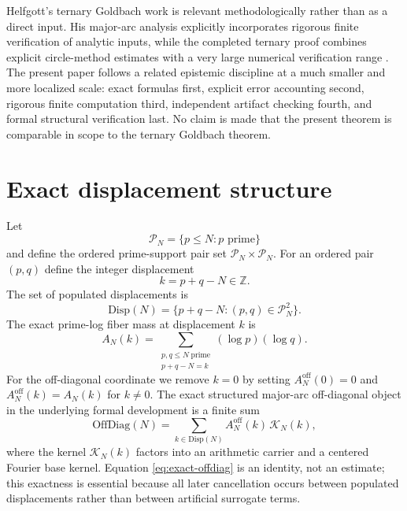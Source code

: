 \documentclass[11pt]{article}
\theoremstyle{definition}
\newcommand{\Disp}{\mathrm{Disp}}
\begin{document}
Helfgott's ternary Goldbach work is relevant methodologically rather than as a direct input. His major-arc analysis explicitly incorporates rigorous finite verification of analytic inputs, while the completed ternary proof combines explicit circle-method estimates with a very large numerical verification range \cite{HelfgottMajor2013,HelfgottPlatt2013,Helfgott2015}. The present paper follows a related epistemic discipline at a much smaller and more localized scale: exact formulas first, explicit error accounting second, rigorous finite computation third, independent artifact checking fourth, and formal structural verification last. No claim is made that the present theorem is comparable in scope to the ternary Goldbach theorem.

\section{Exact displacement structure}\label{sec:structure}

Let
\[
\mathcal P_N=\{p\le N: p\text{ prime}\}
\]
and define the ordered prime-support pair set $\mathcal P_N\times\mathcal P_N$. For an ordered pair $(p,q)$ define the integer displacement
\begin{equation}\label{eq:disp}
k=p+q-N\in\mathbb Z.
\end{equation}
The set of populated displacements is
\[
\Disp(N)=\{p+q-N:(p,q)\in\mathcal P_N^2\}.
\]
The exact prime-log fiber mass at displacement $k$ is
\begin{equation}\label{eq:amplitude}
A_N(k)=
\sum_{\substack{p,q\le N\;\mathrm{prime}\\p+q-N=k}}
(\log p)(\log q).
\end{equation}
For the off-diagonal coordinate we remove $k=0$ by setting $A_N^{\mathrm{off}}(0)=0$ and $A_N^{\mathrm{off}}(k)=A_N(k)$ for $k\ne0$. The exact structured major-arc off-diagonal object in the underlying formal development is a finite sum
\begin{equation}\label{eq:exact-offdiag}
\mathrm{OffDiag}(N)
=
\sum_{k\in\Disp(N)}
A_N^{\mathrm{off}}(k)\,\mathcal K_N(k),
\end{equation}
where the kernel $\mathcal K_N(k)$ factors into an arithmetic carrier and a centered Fourier base kernel. Equation \eqref{eq:exact-offdiag} is an identity, not an estimate; this exactness is essential because all later cancellation occurs between populated displacements rather than between artificial surrogate terms.
\end{document}
